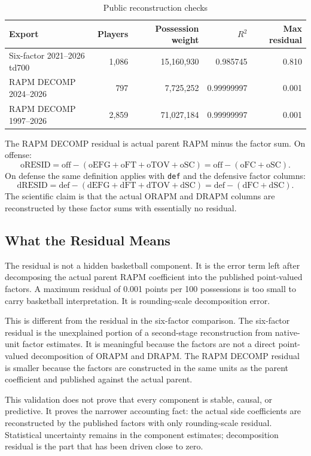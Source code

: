 \documentclass[11pt]{article}
\begin{document}
\begin{table}[h]
\centering
\caption{Public reconstruction checks}
\label{tab:exports}
\begin{tabular}{lrrrr}
\toprule
Export & Players & Possession weight & $R^2$ & Max residual\\
\midrule
Six-factor 2021--2026 td700 & 1,086 & 15,160,930 & 0.985745 & 0.810\\
RAPM DECOMP 2024--2026 & 797 & 7,725,252 & 0.99999997 & 0.001\\
RAPM DECOMP 1997--2026 & 2,859 & 71,027,184 & 0.99999997 & 0.001\\
\bottomrule
\end{tabular}
\end{table}

The RAPM DECOMP residual is actual parent RAPM minus the factor sum.  On
offense:
\[
\text{oRESID}
= \text{off}
- (\text{oEFG}+\text{oFT}+\text{oTOV}+\text{oSC})
= \text{off} - (\text{oFC}+\text{oSC}).
\]
On defense the same definition applies with \texttt{def} and the defensive
factor columns:
\[
\text{dRESID}
= \text{def}
- (\text{dEFG}+\text{dFT}+\text{dTOV}+\text{dSC})
= \text{def} - (\text{dFC}+\text{dSC}).
\]
The scientific claim is that the actual ORAPM and DRAPM columns are
reconstructed by these factor sums with essentially no residual.

\subsection{What the Residual Means}

The residual is not a hidden basketball component.  It is the error term left
after decomposing the actual parent RAPM coefficient into the published
point-valued factors.  A maximum residual of 0.001 points per 100 possessions is
too small to carry basketball interpretation.  It is rounding-scale
decomposition error.

This is different from the residual in the six-factor comparison.  The
six-factor residual is the unexplained portion of a second-stage reconstruction
from native-unit factor estimates.  It is meaningful because the factors are
not a direct point-valued decomposition of ORAPM and DRAPM.  The RAPM DECOMP
residual is smaller because the factors are constructed in the same units as
the parent coefficient and published against the actual parent.

This validation does not prove that every component is stable, causal, or
predictive.  It proves the narrower accounting fact: the actual side
coefficients are reconstructed by the published factors with only rounding-scale
residual.  Statistical uncertainty remains in the component estimates;
decomposition residual is the part that has been driven close to zero.
\end{document}
